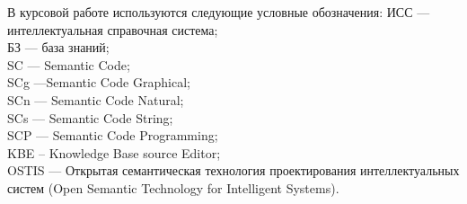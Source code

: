 \label{sec:reduction}
В курсовой работе используются следующие условные обозначения: 
ИСС --- интеллектуальная справочная система;\\
БЗ --- база знаний;\\
SC --- Semantic Code;\\
SCg ---Semantic Code Graphical;\\
SCn --- Semantic Code Natural;\\
SCs --- Semantic Code String;\\
SCP --- Semantic Code Programming;\\
KBE – Knowledge Base source Editor;\\
OSTIS --- Открытая семантическая технология проектирования интеллектуальных систем (Open Semantic Technology for Intelligent Systems).\\
